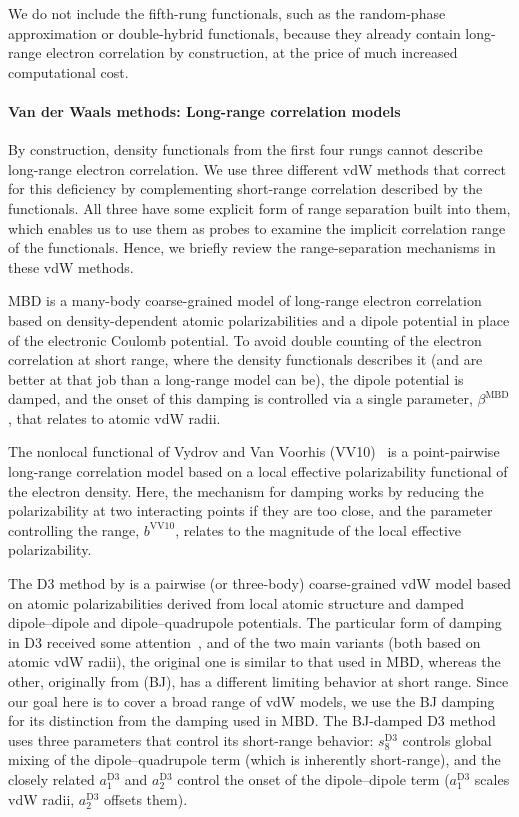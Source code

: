 We do not include the fifth-rung functionals, such as the random-phase approximation or double-hybrid functionals, because they already contain long-range electron correlation by construction, at the price of much increased computational cost.

\paragraph{Van der Waals methods: Long-range correlation models}

By construction, density functionals from the first four rungs cannot describe long-range electron correlation.
We use three different vdW methods that correct for this deficiency by complementing short-range correlation described by the functionals.
All three have some explicit form of range separation built into them, which enables us to use them as probes to examine the implicit correlation range of the functionals.
Hence, we briefly review the range-separation mechanisms in these vdW methods.

MBD is a many-body coarse-grained model of long-range electron correlation based on density-dependent atomic polarizabilities and a dipole potential in place of the electronic Coulomb potential.
To avoid double counting of the electron correlation at short range, where the density functionals describes it (and are better at that job than a long-range model can be), the dipole potential is damped, and the onset of this damping is controlled via a single parameter, $\beta^\text{MBD}$, that relates to atomic vdW radii.

The nonlocal functional of Vydrov and Van Voorhis (VV10)~\cite{VydrovJCP10a} is a point-pairwise long-range correlation model based on a local effective polarizability functional of the electron density.
Here, the mechanism for damping works by reducing the polarizability at two interacting points if they are too close, and the parameter controlling the range, $b^\text{VV10}$, relates to the magnitude of the local effective polarizability.

The D3 method by \citet{GrimmeJCP10} is a pairwise (or three-body) coarse-grained vdW model based on atomic polarizabilities derived from local atomic structure and damped dipole--dipole and dipole--quadrupole potentials.
The particular form of damping in D3 received some attention~\cite{GrimmeJCC11,SchroderJCTC15,SmithJPCL16,WitteJCTC17}, and of the two main variants (both based on atomic vdW radii), the original one is similar to that used in MBD, whereas the other, originally from \citet{JohnsonJCP06} (BJ), has a different limiting behavior at short range.
Since our goal here is to cover a broad range of vdW models, we use the BJ damping for its distinction from the damping used in MBD\@.
The BJ-damped D3 method uses three parameters that control its short-range behavior: $s_8^\text{D3}$ controls global mixing of the dipole--quadrupole term (which is inherently short-range), and the closely related $a_1^\text{D3}$ and $a_2^\text{D3}$ control the onset of the dipole--dipole term ($a_1^\text{D3}$ scales vdW radii, $a_2^\text{D3}$ offsets them).

